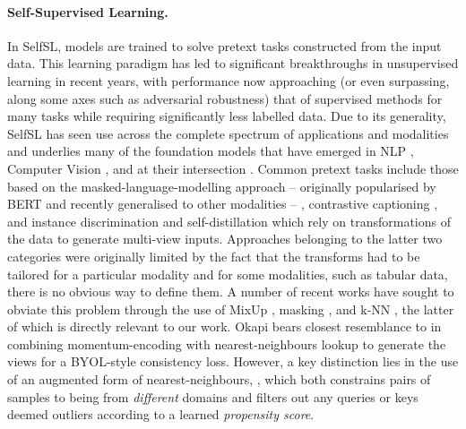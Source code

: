 \paragraph{Self-Supervised Learning.} 
%
In \ac{SelfSL}, models are trained to solve pretext tasks constructed from the input data.
%
This learning paradigm has led to significant breakthroughs in unsupervised learning in recent
years, with performance now approaching (or even surpassing, along some axes such as adversarial
robustness) that of supervised methods for many tasks while requiring significantly less labelled data.
%
Due to its generality, \ac{SelfSL} has seen use across the complete spectrum of applications and
modalities and underlies many of the foundation models \citep{bommasani2021opportunities} that have
emerged in NLP \citep{brown2020language, chowdhery2022palm, devlin2018bert}, Computer Vision
\citep{goyal2022vision}, and at their intersection \citep{alayrac2022flamingo, yu2022coca}.
%
Common pretext tasks include those based on the masked-language-modelling approach -- originally
popularised by BERT \citep{devlin2018bert} and recently generalised to other modalities
\citep{baevski2022data2vec, bao2021beit} -- \citep{chen2020simple, he2020momentum}, contrastive
captioning  \citep{radford2021learning, yu2022coca}, and instance discrimination and
self-distillation \citep{caron2021emerging, grill2020bootstrap} which rely on transformations of
the data to generate multi-view inputs.
%
Approaches belonging to the latter two categories were originally limited by the fact that the
transforms had to be tailored for a particular modality and for some modalities, such as tabular
data, there is no obvious way to define them.
%
A number of recent works have sought to obviate this problem through the use of  MixUp
\citep{verma2021towards}, masking \citep{baevski2022data2vec, MaskedAutoencoders2021}, and k-NN
\citep{dwibedi2021little, koohpayegani2021mean, van2021revisiting}, the latter of which is directly
relevant to our work.
%
Okapi bears closest resemblance to \citet{koohpayegani2021mean} in combining momentum-encoding with
nearest-neighbours lookup to generate the views for a BYOL-style \citep{grill2020bootstrap}
consistency loss. 
%
However, a key distinction lies in the use of an augmented form of nearest-neighbours, \CNN, which
both constrains pairs of samples to being from \emph{different} domains and filters out any queries
or keys deemed outliers according to a learned \emph{propensity score}. 

